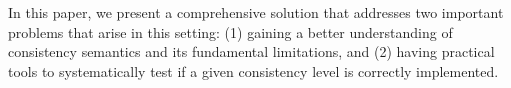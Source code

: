 \documentclass[conference]{IEEEtran}
\begin{document}
	In this paper, we present a comprehensive solution that addresses two important problems that arise in this setting: (1) gaining a better understanding of consistency semantics and its fundamental limitations, and (2) having practical tools to systematically test if a given consistency level is correctly implemented.
	
	
	
	
\end{document}
